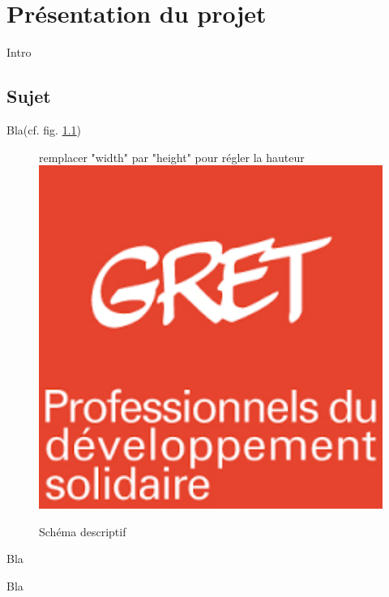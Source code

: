 \chapter{Présentation du projet}

Intro\footnotemark\\

\section{Sujet}

Bla(cf. fig. \ref{Tux})\\

\begin{figure}
\begin{center}
remplacer "width" par "height" pour régler la hauteur
\includegraphics[width=15cm]{logo/GRET_logo}
\end{center}
\caption{Schéma descriptif}
\label{Tux}
\end{figure}

{}

Bla

Bla\\

